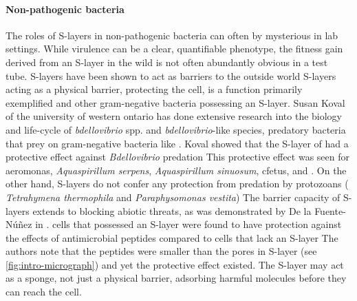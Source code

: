 \paragraph{Non-pathogenic bacteria}  %
The roles of \acp{S-layer} in non-pathogenic bacteria can often by mysterious in lab settings. While virulence can be a clear, quantifiable phenotype, the fitness gain derived from an \ac{S-layer} in the wild is not often abundantly obvious in a test tube. \acp{S-layer} have been shown to act as barriers to the outside world
\acp{S-layer} acting as a physical barrier, protecting the cell, is a function primarily exemplified \caulobacter and other gram-negative bacteria possessing an \ac{S-layer}. Susan Koval of the university of western ontario has done extensive research into the biology and life-cycle of \textit{bdellovibrio} spp. and \textit{bdellovibrio}-like species, predatory bacteria that prey on gram-negative bacteria like \caulobacter. Koval showed that the \ac{S-layer} of \caulobacter had a protective effect against \textit{Bdellovibrio} predation This protective effect was seen for  \ac{aeromonas}, \textit{Aquaspirillum serpens}, \textit{Aquaspirillum sinuosum}, \ac{cfetus}, and \caulobacter. On the other hand, \acp{S-layer} do not confer any protection from predation by protozoans (\eg{} \textit{Tetrahymena thermophila} and \textit{Paraphysomonas vestita}) The barrier capacity of \acp{S-layer} extends to blocking abiotic threats, as was demonstrated by De la Fuente-N{\'u}{\~n}ez \etal in . \caulobacter cells that possessed an \ac{S-layer} were found to have protection against the effects of antimicrobial peptides compared to cells that lack an \ac{S-layer} The authors note that the peptides were smaller than the pores in \caulobacter \ac{S-layer} (see \cref{fig:intro-micrograph}) and yet the protective effect existed. The \ac{S-layer} may act as a sponge, not just a physical barrier, adsorbing harmful molecules before they can reach the cell. 

